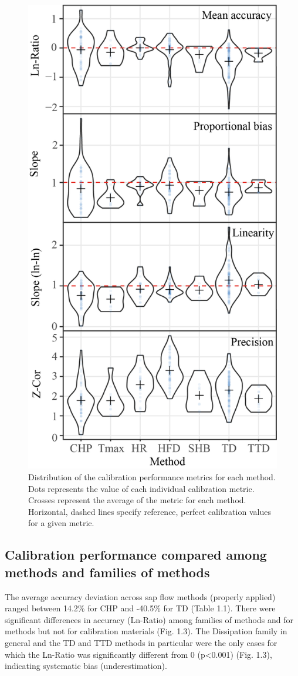\documentclass[11pt,twoside]{reedthesis}
\begin{document}
\begin{figure}[hbt!]

{\centering \includegraphics[width=0.55\linewidth]{figure/CH2/Distribution-metrics-orderedV4} 

}

\caption{Distribution of the calibration performance metrics for each method. Dots represents the value of each individual calibration metric. Crosses represent the average of the metric for each method. Horizontal, dashed lines specify reference, perfect calibration values for a given metric.}\label{fig:ch1fig2}
\end{figure}
\subsection{Calibration performance compared among methods and families
of
methods}\label{calibration-performance-compared-among-methods-and-families-of-methods}

The average accuracy deviation across sap flow methods (properly
applied) ranged between 14.2\% for CHP and -40.5\% for TD (Table 1.1).
There were significant differences in accuracy (Ln-Ratio) among families
of methods and for methods but not for calibration materials (Fig. 1.3).
The Dissipation family in general and the TD and TTD methods in
particular were the only cases for which the Ln-Ratio was significantly
different from 0 (p\textless{}0.001) (Fig. 1.3), indicating systematic
bias (underestimation).\par
\end{document}
